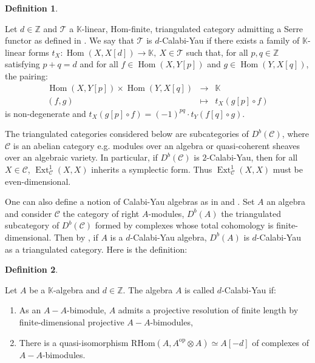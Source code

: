 \documentclass[11pt,english]{article}
\numberwithin{equation}{section}
\numberwithin{figure}{section}
\theoremstyle{definition}
\newtheorem{df}{Definition}[subsection]
\theoremstyle{plain}
\theoremstyle{remark}
\DeclareMathOperator{\Hom}{Hom}
\DeclareMathOperator{\Ext}{Ext}
\newcommand\KK{\mathbb{K}}
\begin{document}
\begin{df} \label{Def/CYCat}

Let $d\in\mathbb{Z}$ and $\mathcal{T}$ a $\KK$-linear, Hom-finite,
triangulated category admitting a Serre functor as defined in \cite[\S2.6.]{Kel08}.
We say that $\mathcal{T}$ is $d$-Calabi-Yau if there exists a family
of $\KK$-linear forms $t_{X}:\Hom(X,X[d])\rightarrow\KK,\ X\in\mathcal{T}$
such that, for all $p,q\in\mathbb{Z}$ satisfying $p+q=d$ and for
all $f\in\Hom(X,Y[p])$ and $g\in\Hom(Y,X[q])$, the pairing:\[
\begin{array}{cll}
\Hom(X,Y[p])\times\Hom(Y,X[q]) & \rightarrow & \KK \\
(f,g) & \mapsto & t_X(g[p]\circ f)
\end{array}
\]is non-degenerate and $t_{X}(g[p]\circ f)=(-1)^{pq}\cdot t_{Y}(f[q]\circ g)$.

\end{df}

The triangulated categories considered below are subcategories of
$D^{b}(\mathcal{C})$, where $\mathcal{C}$ is an abelian category
e.g. modules over an algebra or quasi-coherent sheaves over an algebraic
variety. In particular, if $D^{b}(\mathcal{C})$ is $2$-Calabi-Yau,
then for all $X\in\mathcal{C}$, $\Ext_{\mathcal{C}}^{1}(X,X)$ inherits
a symplectic form. Thus $\Ext_{\mathcal{C}}^{1}(X,X)$ must be even-dimensional.

One can also define a notion of Calabi-Yau algebras as in \cite[\S 3.2.]{Gin06}
and \cite[\S 7]{VdB15}. Set $A$ an algebra and consider $\mathcal{C}$
the category of right $A$-modules, $D^{b}(A)$ the triangulated subcategory
of $D^{b}(\mathcal{C})$ formed by complexes whose total cohomology
is finite-dimensional. Then by \cite[\S4.1-2.]{Kel08}, if $A$ is
a $d$-Calabi-Yau algebra, $D^{b}(A)$ is $d$-Calabi-Yau as a triangulated
category. Here is the definition:

\begin{df} \label{Def/CYAlg}

Let $A$ be a $\KK$-algebra and $d\in\mathbb{Z}$. The algebra $A$
is called $d$-Calabi-Yau if:
\begin{enumerate}
\item As an $A-A$-bimodule, $A$ admits a projective resolution of finite
length by finite-dimensional projective $A-A$-bimodules,
\item There is a quasi-isomorphism $\mathrm{RHom}(A,A^{\mathrm{op}}\otimes A)\simeq A[-d]$
of complexes of $A-A$-bimodules.
\end{enumerate}
\end{df}
\end{document}
